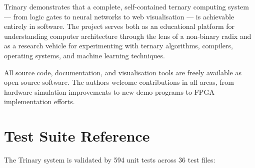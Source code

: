 \documentclass[12pt,a4paper,twoside]{book}
\theoremstyle{trinarytheorem}
\theoremstyle{trinarydefinition}
\begin{document}
Trinary demonstrates that a complete, self-contained ternary computing
system --- from logic gates to neural networks to web visualisation ---
is achievable entirely in software. The project serves both as an
educational platform for understanding computer architecture through
the lens of a non-binary radix and as a research vehicle for
experimenting with ternary algorithms, compilers, operating systems,
and machine learning techniques.

All source code, documentation, and visualisation tools are freely
available as open-source software. The authors welcome contributions
in all areas, from hardware simulation improvements to new demo
programs to FPGA implementation efforts.

\appendix

\chapter{Test Suite Reference}
\label{app:tests}

The Trinary system is validated by 594 unit tests across 36 test files:
\end{document}
